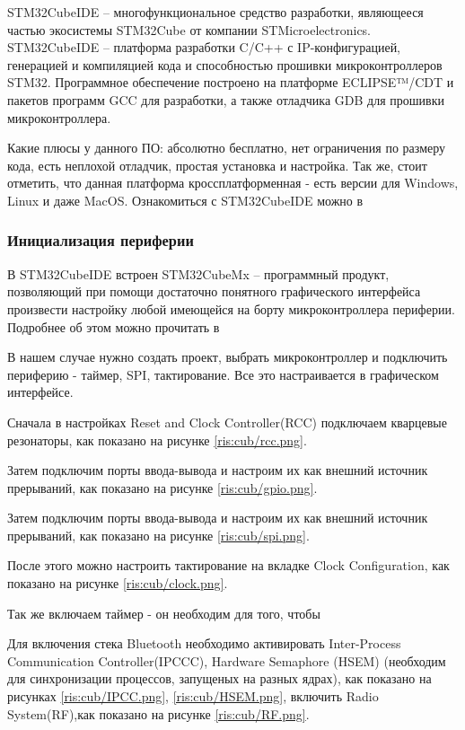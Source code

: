 \begin{sloppypar}
STM32CubeIDE – многофункциональное средство разработки, являющееся частью экосистемы STM32Cube от компании STMicroelectronics.
STM32CubeIDE – платформа разработки C/C++ с IP-конфигурацией, генерацией и компиляцией кода и способностью прошивки микроконтроллеров STM32.
Программное обеспечение построено на платформе ECLIPSE™/CDT и пакетов программ GCC для разработки, а также отладчика GDB для прошивки микроконтроллера.


Какие плюсы у данного ПО: абсолютно бесплатно, нет ограничения по размеру кода, есть неплохой отладчик, простая установка и настройка. Так же, стоит отметить, что данная платформа кроссплатформенная - есть версии для Windows, Linux и даже MacOS. Ознакомиться с STM32CubeIDE можно в \cite{STM32CubeIDE}

\subsubsection{Инициализация периферии}
В STM32CubeIDE встроен STM32CubeMx -- программный продукт, позволяющий при помощи достаточно понятного графического интерфейса произвести настройку любой имеющейся на борту микроконтроллера периферии. Подробнее об этом можно прочитать в \cite{cube}

В нашем случае нужно создать проект, выбрать микроконтроллер и подключить периферию - таймер, SPI, тактирование. Все это настраивается в графическом интерфейсе.

Сначала в настройках Reset and Clock Controller(RCC) подключаем кварцевые резонаторы, как показано на рисунке \ref{ris:cub/rcc.png}.

Затем подключим порты ввода-вывода и настроим их как внешний источник прерываний, как показано на рисунке \ref{ris:cub/gpio.png}.

Затем подключим порты ввода-вывода и настроим их как внешний источник прерываний, как показано на рисунке \ref{ris:cub/spi.png}.

После этого можно настроить тактирование на вкладке Clock Configuration, как показано на рисунке \ref{ris:cub/clock.png}.

Так же включаем таймер - он необходим для того, чтобы 


Для включения стека Bluetooth необходимо активировать Inter-Process Communication Controller(IPCCC), Hardware Semaphore (HSEM) (необходим для синхронизации процессов, запущеных на разных ядрах), как показано на рисунках  \ref{ris:cub/IPCC.png}, \ref{ris:cub/HSEM.png}, включить Radio System(RF),как показано на рисунке \ref{ris:cub/RF.png}.


\end{sloppypar}
